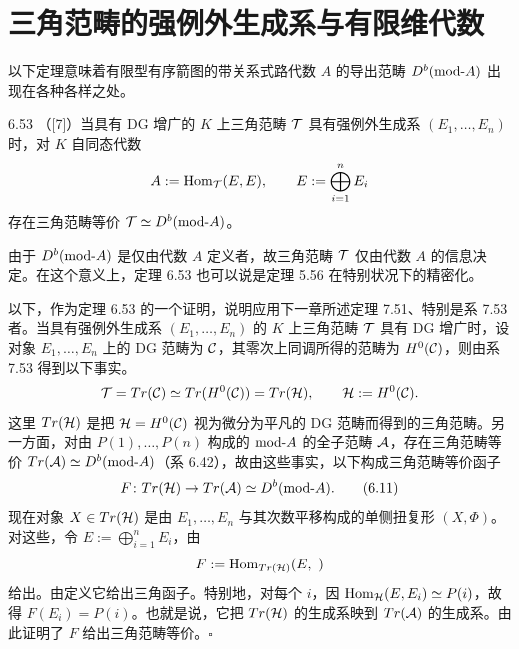 \section{三角范畴的强例外生成系与有限维代数}

以下定理意味着有限型有序箭图的带关系式路代数 $A$ 的导出范畴 $D^{b}(\mathrm{mod}\text{-}A)$ 出现在各种各样之处。

\begin{theorem}{6.53}
（[7]）当具有 DG 增广的 $K$ 上三角范畴 $\mathcal{T}$ 具有强例外生成系 $(E_1,\dots,E_n)$ 时，对 $K$ 自同态代数
\[
A:=\operatorname{Hom}_{\mathcal{T}}(E,E),\qquad E:=\bigoplus_{i=1}^{n}E_i
\]
存在三角范畴等价 $\mathcal{T}\simeq D^{b}(\mathrm{mod}\text{-}A)$。
\end{theorem}

由于 $D^{b}(\mathrm{mod}\text{-}A)$ 是仅由代数 $A$ 定义者，故三角范畴 $\mathcal{T}$ 仅由代数 $A$ 的信息决定。在这个意义上，定理 6.53 也可以说是定理 5.56 在特别状况下的精密化。

以下，作为定理 6.53 的一个证明，说明应用下一章所述定理 7.51、特别是系 7.53 者。当具有强例外生成系 $(E_1,\dots,E_n)$ 的 $K$ 上三角范畴 $\mathcal{T}$ 具有 DG 增广时，设对象 $E_1,\dots,E_n$ 上的 DG 范畴为 $\mathcal{C}$，其零次上同调所得的范畴为 $H^{0}(\mathcal{C})$，则由系 7.53 得到以下事实。
\[
\mathcal{T}=Tr(\mathcal{C})\simeq Tr(H^{0}(\mathcal{C}))=Tr(\mathcal{H}),\qquad \mathcal{H}:=H^{0}(\mathcal{C}).
\]
这里 $Tr(\mathcal{H})$ 是把 $\mathcal{H}=H^{0}(\mathcal{C})$ 视为微分为平凡的 DG 范畴而得到的三角范畴。另一方面，对由 $P(1),\dots,P(n)$ 构成的 $\mathrm{mod}\text{-}A$ 的全子范畴 $\mathcal{A}$，存在三角范畴等价 $Tr(\mathcal{A})\simeq D^{b}(\mathrm{mod}\text{-}A)$（系 6.42），故由这些事实，以下构成三角范畴等价函子
\begin{equation}
F\colon Tr(\mathcal{H})\to Tr(\mathcal{A})\simeq D^{b}(\mathrm{mod}\text{-}A). \tag{6.11}
\end{equation}
现在对象 $X\in Tr(\mathcal{H})$ 是由 $E_1,\dots,E_n$ 与其次数平移构成的单侧扭复形 $(X,\Phi)$。对这些，令 $E:=\bigoplus_{i=1}^{n}E_i$，由
\[
F:=\operatorname{Hom}_{Tr(\mathcal{H})}(E,\ )
\]
给出。由定义它给出三角函子。特别地，对每个 $i$，因 $\operatorname{Hom}_{\mathcal{H}}(E,E_i)\simeq P(i)$，故得 $F(E_i)=P(i)$。也就是说，它把 $Tr(\mathcal{H})$ 的生成系映到 $Tr(\mathcal{A})$ 的生成系。由此证明了 $F$ 给出三角范畴等价。\hfill$\square$


